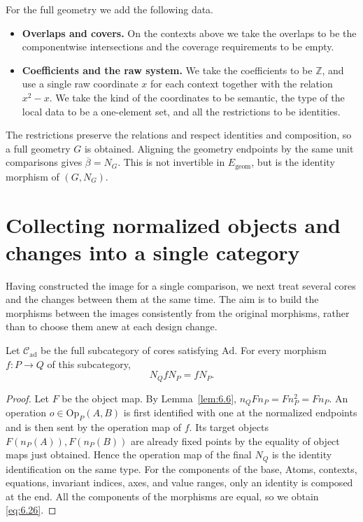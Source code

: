 \begin{example}
For the full geometry we add the following data.

\begin{itemize}
\item \textbf{Overlaps and covers.} On the contexts above we take the overlaps to be the
componentwise intersections and the coverage requirements to be empty.
\item \textbf{Coefficients and the raw system.} We take the coefficients to be $\mathbb{Z}$,
and use a single raw coordinate $x$ for each context together with the relation $x^2-x$.
We take the kind of the coordinates to be semantic, the type of the local data to be a
one-element set, and all the restrictions to be identities.
\end{itemize}

The restrictions preserve the relations and respect identities and composition, so a full
geometry $G$ is obtained.
Aligning the geometry endpoints by the same unit comparisons gives
$\overline\beta=N_G$. This is not invertible in $E_{\mathrm{geom}}$, but is
the identity morphism of $(G,N_G)$.

\end{example}

\section{Collecting normalized objects and changes into a single category}\label{sec:6.5}

Having constructed the image for a single comparison, we next treat several cores and the
changes between them at the same time.
The aim is to build the morphisms between the images consistently from the original
morphisms, rather than to choose them anew at each design change.

\begin{lemma}\label{lem:6.19}

Let $\mathcal{C}_{\mathrm{ad}}$ be the full subcategory of cores satisfying
$\mathrm{Ad}$. For every morphism $f:P\to Q$ of this subcategory,
\begin{equation*}
N_QfN_P=fN_P.
\tag{6.26}\label{eq:6.26}
\end{equation*}

\end{lemma}

\begin{proof}

Let $F$ be the object map. By Lemma~\ref{lem:6.6},
$n_QFn_P=Fn_P^2=Fn_P$.
An operation $o\in\mathrm{Op}_P(A,B)$ is first identified with one at the normalized
endpoints and is then sent by the operation map of $f$.
Its target objects $F(n_P(A)),F(n_P(B))$ are already fixed points by the equality of object
maps just obtained.
Hence the operation map of the final $N_Q$ is the identity identification on the same type.
For the components of the base, Atoms, contexts, equations, invariant indices, axes, and
value ranges, only an identity is composed at the end.
All the components of the morphisms are equal, so we obtain \eqref{eq:6.26}.

\end{proof}

